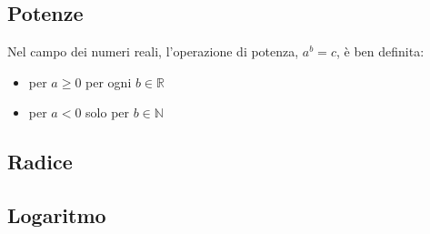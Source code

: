 \documentclass[letterpaper,10pt,italian]{jupyterBook}
\begin{document}
\subsection{Potenze}
\label{\detokenize{ch/algebra/real-algebra:potenze}}
\sphinxAtStartPar
Nel campo dei numeri reali, l’operazione di potenza, \(a^b = c\), è ben definita:
\begin{itemize}
\item {} 
\sphinxAtStartPar
per \(a \ge 0\) per ogni \(b \in \mathbb{R}\)

\item {} 
\sphinxAtStartPar
per \(a < 0\) solo per \(b \in \mathbb{N}\)

\end{itemize}

\sphinxAtStartPar
{} 


\subsection{Radice}
\label{\detokenize{ch/algebra/real-algebra:radice}}
\sphinxAtStartPar
{}

\sphinxAtStartPar
{}


\subsection{Logaritmo}
\label{\detokenize{ch/algebra/real-algebra:logaritmo}}
\sphinxAtStartPar
{}

\sphinxAtStartPar
{}
\end{document}
